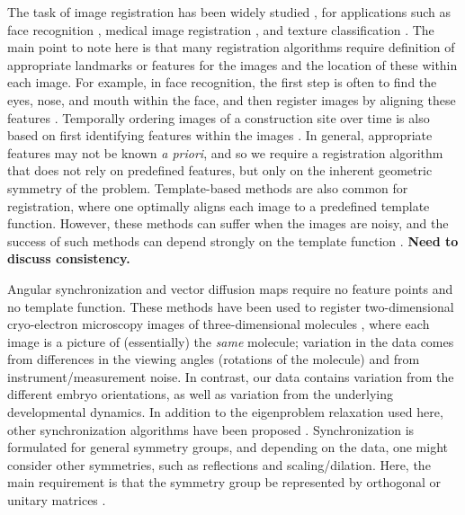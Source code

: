 \documentclass{pnastwo}
\begin{document}
\begin{article}
The task of image registration has been widely studied \cite{zitova2003image}, for applications such as face recognition \cite{rowley1998rotation}, medical image registration \cite{hajnal2010medical}, and texture classification \cite{greenspan1994rotation}.
%
The main point to note here is that many registration algorithms require definition of appropriate landmarks or features for the images and the location of these within each image.
%
For example, in face recognition, the first step is often to find the eyes, nose, and mouth within the face, and then register images by aligning these features \cite{zhao2003face}.
%
Temporally ordering images of a construction site over time is also based on first identifying features within the images \cite{schindler2007inferring}.
%
In general, appropriate features may not be known {\em a priori}, and so we require a registration algorithm that does not rely on predefined features, but only on the inherent geometric symmetry of the problem.
%
Template-based methods are also common for registration, where one optimally aligns each image to a predefined template function.
%
However, these methods can suffer when the images are noisy, and the success of such methods can depend strongly on the template function \cite{shatsky2009method}.
%
{\bf Need to discuss consistency.}

Angular synchronization and vector diffusion maps require no feature points and no template function.
%
These methods have been used to register two-dimensional cryo-electron microscopy images of three-dimensional molecules \cite{singer2011three}, where each image is a picture of (essentially) the {\em same} molecule; variation in the data comes from differences in the viewing angles (rotations of the molecule) and from instrument/measurement noise.
%
In contrast, our data contains variation from the different embryo orientations, as well as variation from the underlying developmental dynamics. %
%
In addition to the eigenproblem relaxation used here, other synchronization algorithms have been proposed \cite{bandeira2014multireference}.
%
Synchronization is formulated for general symmetry groups, and depending on the data, one might consider other symmetries, such as reflections and scaling/dilation.
%
Here, the main requirement is that the symmetry group be represented by orthogonal or unitary matrices \cite{singer2013spectral}.


\end{article}
\end{document}
